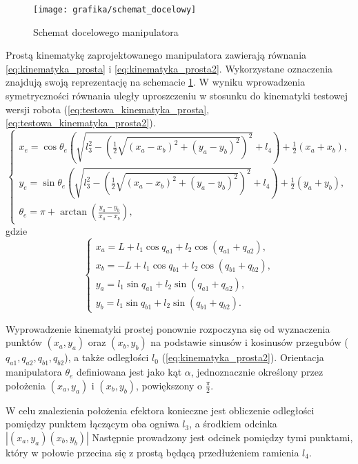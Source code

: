 \documentclass[printmode]{mgr}
\begin{document}
\begin{figure}[tp]
\centering
  \texttt{[image: grafika/schemat\_docelowy]}
  \caption{Schemat docelowego manipulatora}
  \label{rys:schemat_docelowy}  
\end{figure}


Prostą kinematykę zaprojektowanego manipulatora zawierają równania \ref{eq:kinematyka_prosta} i \ref{eq:kinematyka_prosta2}.
Wykorzystane oznaczenia znajdują swoją reprezentację na schemacie \ref{rys:schemat_docelowy}.
W wyniku wprowadzenia symetryczności równania uległy uproszczeniu w stosunku do kinematyki testowej wersji robota (\ref{eq:testowa_kinematyka_prosta}, \ref{eq:testowa_kinematyka_prosta2}).
\begin{equation}
\begin{cases}
x_e = \cos\theta_e(\sqrt{l_3^2-(\frac{1}{2}\sqrt{(x_a-x_b)^2+(y_a-y_b)^2})^2} + l_4) + \frac{1}{2}(x_a+x_b),\\
y_e = \sin\theta_e(\sqrt{l_3^2-(\frac{1}{2}\sqrt{(x_a-x_b)^2+(y_a-y_b)^2})^2} + l_4) + \frac{1}{2}(y_a+y_b),\\
\theta_e = \pi + \arctan(\frac{y_a-y_b}{x_a-x_b}),
\end{cases}
\label{eq:kinematyka_prosta}
\end{equation}
gdzie
\begin{equation}
\begin{cases}
x_a = L + l_1\cos q_{a1} + l_2 \cos(q_{a1}+q_{a2}),\\
x_b = -L + l_1\cos q_{b1} + l_2 \cos(q_{b1}+q_{b2}),\\
y_a = l_1\sin q_{a1} + l_2 \sin(q_{a1}+q_{a2}),\\
y_b = l_1\sin q_{b1} + l_2 \sin(q_{b1}+q_{b2}).
\end{cases}
\label{eq:kinematyka_prosta2}
\end{equation}

Wyprowadzenie kinematyki prostej ponownie rozpoczyna się od wyznaczenia punktów $(x_a, y_a)$ oraz $(x_b, y_b)$ na podstawie
sinusów i kosinusów przegubów ($q_{a1}, q_{a2}, q_{b1}, q_{b2}$), a także odległości $l_0$ (\ref{eq:kinematyka_prosta2}).
Orientacja manipulatora $\theta_e$ definiowana jest jako kąt $\alpha$, jednoznacznie określony przez położenia $(x_a, y_a)$ i $(x_b, y_b)$,
powiększony o $\frac{\pi}{2}$.

W celu znalezienia położenia efektora konieczne jest obliczenie odległości pomiędzy punktem łączącym oba ogniwa $l_3$, a
środkiem odcinka $|(x_a, y_a)(x_b, y_b)|$
Następnie prowadzony jest odcinek pomiędzy tymi punktami, który w połowie przecina się z prostą będącą przedłużeniem ramienia $l_4$.
\end{document}
